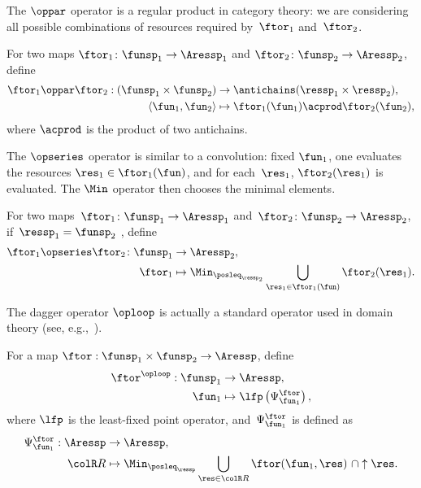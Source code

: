 The $\oppar$ operator is a regular product in category theory: we
are considering all possible combinations of resources required by~$\ftor_{1}$
and~$\ftor_{2}$.
\begin{definition}
    \label{def:opmaps}For two maps $\ftor_{1}\colon\funsp_{1}\rightarrow\Aressp_{1}$
    and $\ftor_{2}\colon\funsp_{2}\rightarrow\Aressp_{2}$, define
    \begin{align*}
        \ftor_{1}\oppar\ftor_{2}:(\funsp_{1}\times\funsp_{2}) & \rightarrow\antichains(\ressp_{1}\times\ressp_{2}),\\
        \left\langle \fun_{1},\fun_{2}\right\rangle  & \mapsto\ftor_{1}(\fun_{1})\acprod\ftor_{2}(\fun_{2}),
    \end{align*}
    where $\acprod$ is the product of two antichains.
\end{definition}
The $\opseries$ operator is similar to a convolution: fixed $\fun_{1}$,
one evaluates the resources $\res_{1}\in\ftor_{1}(\fun)$, and for
each~$\res_{1}$, $\ftor_{2}(\res_{1})$ is evaluated. The $\Min$
operator then chooses the minimal elements.
\begin{definition}
    \label{def:opseries}For two maps~$\ftor_{1}\colon\funsp_{1}\rightarrow\Aressp_{1}$
    and~$\ftor_{2}\colon\funsp_{2}\rightarrow\Aressp_{2}$, if~$\ressp_{1}=\funsp_{2}$
    , define
    \begin{align*}
    {\displaystyle \ftor_{1}\opseries\ftor_{2}\colon\funsp_{1}}
        & \rightarrow\Aressp_{2},\\
        \ftor_{1} & \mapsto\Min_{\posleq_{\ressp_{2}}}\bigcup_{\res_{1}\in\ftor_{1}(\fun)}\ftor_{2}(\res_{1}).
    \end{align*}

\end{definition}


The dagger operator $\oploop$ is actually a standard operator used
in domain theory (see, e.g.,~\cite[II-2.29]{gierz03continuous}).
\begin{definition}
    \label{def:oploop}For a map $\ftor:\funsp_{1}\times\funsp_{2}\rightarrow\Aressp$,
    define
    \begin{align}
        \ftor^{\oploop}:\funsp_{1} & \rightarrow\Aressp,\nonumber \\
        \fun_{1} & \mapsto\lfp\left(\Psi_{\fun_{1}}^{\ftor}\right),
    \end{align}
    where $\lfp$ is the least-fixed point operator, and~$\Psi_{\fun_{1}}^{\ftor}$
    is defined as
    \begin{align*}
        \Psi_{\fun_{1}}^{\ftor}:\Aressp & \rightarrow\Aressp,\\
        {\colR R} & \mapsto\Min_{\posleq_{\ressp}}\bigcup_{\res\in{\colR R}}\ftor(\fun_{1},\res)\ \cap\uparrow\res.
    \end{align*}
\end{definition}


